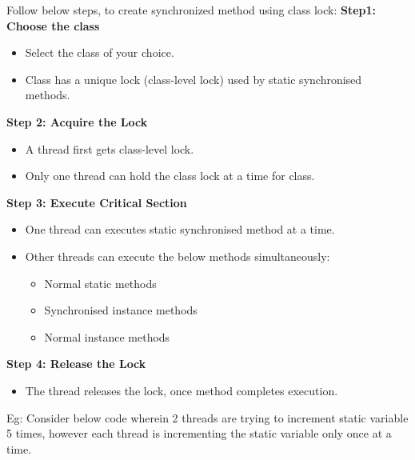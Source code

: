 \setlength{\columnsep}{3pt}
\begin{flushleft}

	Follow below steps, to create synchronized method using class lock:
	\newline
	\textbf{Step1: Choose the class}
		\begin{itemize}
			\item Select the class of your choice.
			\item Class has a unique lock (class-level lock) used by static synchronised methods.
		\end{itemize}
	
	\textbf{Step 2: Acquire the Lock}
		\begin{itemize}
			\item A thread first gets class-level lock.
			\item Only one thread can hold the class lock at a time for class.
		\end{itemize}
	
	\textbf{Step 3: Execute Critical Section}
		\begin{itemize}
			\item One thread can executes static synchronised method at a time.
			\item Other threads can execute the below methods simultaneously:
			\begin{itemize}
				\item Normal static methods
				\item Synchronised instance methods
				\item Normal instance methods
			\end{itemize}
		\end{itemize}
		
	\textbf{Step 4: Release the Lock}
		\begin{itemize}
			\item The thread releases the lock, once method completes execution.
		\end{itemize} 

		
		
	Eg: Consider below code wherein 2 threads are trying to increment static variable 5 times, however each thread is incrementing the static variable only once at a time.
		

\end{flushleft}
